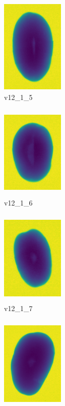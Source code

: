 \documentclass[11pt]{article}
\begin{document}
\begin{figure}
    
         \begin{subfigure}[b]{0.15\textwidth}
         \centering
         \includegraphics[width=3cm, height=4.5cm]{images/kartofler/v12_1_5_cut.png}
         \caption{v12\_1\_5}
         \label{fig:y equals x}
     \end{subfigure}
     \hfill
     \begin{subfigure}[b]{0.15\textwidth}
         \centering
         \includegraphics[width=3cm, height=4.5cm]{images/kartofler/v12_1_6_cut.png}
        \caption{v12\_1\_6}
         \label{fig:three sin x}
     \end{subfigure}
     \hfill
     \begin{subfigure}[b]{0.15\textwidth}
         \centering
         \includegraphics[width=3cm, height=4.5cm]{images/kartofler/v12_1_7_cut.png}
        \caption{v12\_1\_7}
         \label{fig:five over x}
     \end{subfigure}
     \hfill
    \begin{subfigure}[b]{0.15\textwidth}
         \centering
         \includegraphics[width=3cm, height=4.5cm]{images/kartofler/v12_1_8_cut.png}

\end{subfigure}
\end{figure}
\end{document}
